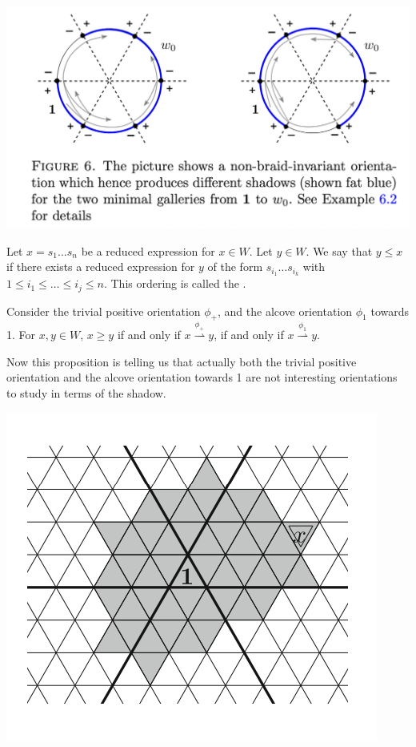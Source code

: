 \documentclass[11pt]{article}
\begin{document}
\begin{center}
\includegraphics[scale=0.6]{Screenshot 2023-02-08 at 10.39.18.png}\\
\end{center}
\begin{definition}
    Let $x=s_1\hdots s_n$ be a reduced expression for $x\in W$. Let $y\in W$. We say that $y\leq x$ if there exists a reduced expression for $y$ of the form $s_{i_1}\hdots s_{i_k}$ with $1\leq i_1\leq\hdots \leq i_j\leq n$. This ordering is called the .
\end{definition}

\begin{proposition}
    Consider the trivial positive orientation $\phi_+$, and the alcove orientation $\phi_1$ towards 1. For $x,y\in W$, $x\geq y$ if and only if $x\stackrel{\phi_+}{\rightharpoonup} y$, if and only if $x\stackrel{\phi_1}{\rightharpoonup} y$.
\end{proposition}

Now this proposition is telling us that actually both the trivial positive orientation and the alcove orientation towards 1 are not interesting orientations to study in terms of the shadow. 

\begin{center}
    \includegraphics[scale=0.6]{Screenshot 2023-03-07 133912.png}\\
\end{center}
\end{document}
